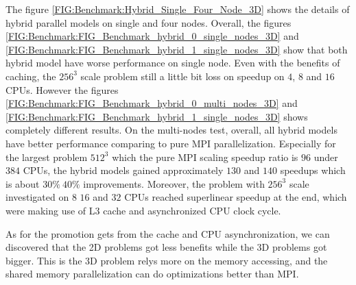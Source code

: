 The figure \ref{FIG:Benchmark:Hybrid_Single_Four_Node_3D} shows the details of hybrid parallel models on single and four nodes.
Overall, the figures \ref{FIG:Benchmark:FIG_Benchmark_hybrid_0_single_nodes_3D} and \ref{FIG:Benchmark:FIG_Benchmark_hybrid_1_single_nodes_3D}
show that both hybrid model have worse performance on single node. Even with the benefits of caching, the $256^3$ scale problem still 
a little bit loss on speedup on $4$, $8$ and $16$ CPUs.
However the figures \ref{FIG:Benchmark:FIG_Benchmark_hybrid_0_multi_nodes_3D} and \ref{FIG:Benchmark:FIG_Benchmark_hybrid_1_single_nodes_3D} 
shows completely different results.
On the multi-nodes test, overall, all hybrid models have better performance comparing to pure MPI parallelization.
Especially for the largest problem $512^3$ which the pure MPI scaling speedup ratio is $96$ under $384$ CPUs, the 
hybrid models gained approximately $130$ and $140$ speedups which is about $30\% ~ 40\%$ improvements.
Moreover, the problem with $256^3$ scale investigated on $8$ $16$ and $32$ CPUs reached superlinear speedup at the end,
which were making use of L3 cache and asynchronized CPU clock cycle.

As for the promotion gets from the cache and CPU asynchronization, we can discovered that the 2D problems got less benefits 
while the 3D problems got bigger.
This is the 3D problem relys more on the memory accessing, and the shared memory parallelization can do optimizations better than MPI.

